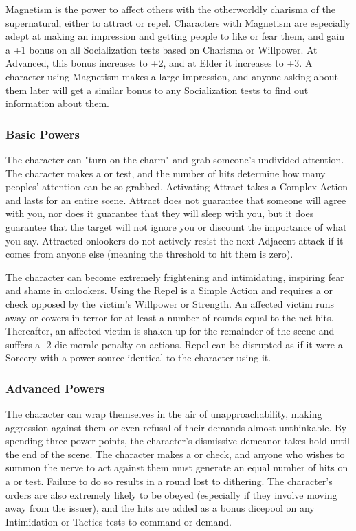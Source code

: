 Magnetism is the power to affect others with the otherworldly charisma of the supernatural, either to attract or repel. Characters with Magnetism are especially adept at making an impression and getting people to like or fear them, and gain a +1 bonus on all Socialization tests based on Charisma or Willpower. At Advanced, this bonus increases to +2, and at Elder it increases to +3. A character using Magnetism makes a large impression, and anyone asking about them later will get a similar bonus to any Socialization tests to find out information about them.

\subsubsection{Basic Powers}

 The character can "turn on the charm" and grab someone's undivided attention. The character makes a  or  test, and the number of hits determine how many peoples' attention can be so grabbed. Activating Attract takes a Complex Action and lasts for an entire scene. Attract does not guarantee that someone will agree with you, nor does it guarantee that they will sleep with you, but it does guarantee that the target will not ignore you or discount the importance of what you say. Attracted onlookers do not actively resist the next Adjacent attack if it comes from anyone else (meaning the threshold to hit them is zero).

 The character can become extremely frightening and intimidating, inspiring fear and shame in onlookers. Using the Repel is a Simple Action and requires a  or  check opposed by the victim's Willpower or Strength. An affected victim runs away or cowers in terror for at least a number of rounds equal to the net hits. Thereafter, an affected victim is shaken up for the remainder of the scene and suffers a -2 die morale penalty on actions. Repel can be disrupted as if it were a Sorcery with a power source identical to the character using it.

\subsubsection{Advanced Powers}

 The character can wrap themselves in the air of unapproachability, making aggression against them or even refusal of their demands almost unthinkable. By spending three power points, the character's dismissive demeanor takes hold until the end of the scene. The character makes a  or  check, and anyone who wishes to summon the nerve to act against them must generate an equal number of hits on a  or  test. Failure to do so results in a round lost to dithering. The character's orders are also extremely likely to be obeyed (especially if they involve moving away from the issuer), and the hits are added as a bonus dicepool on any Intimidation or Tactics tests to command or demand.

